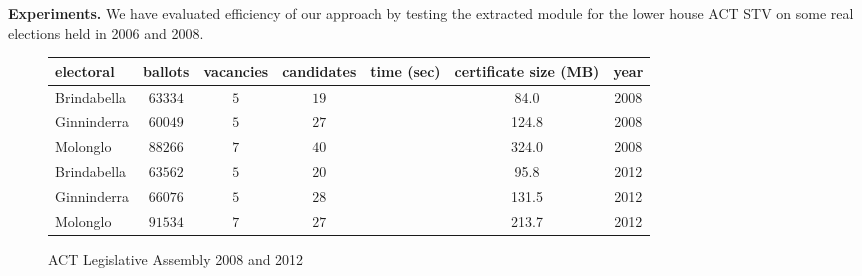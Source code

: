 \documentclass{llncs}
\begin{document}
 \noindent\textbf{Experiments.} We have evaluated efficiency of our approach by testing the extracted module for the lower house ACT STV on some real elections held in 2006 and 2008. 
 \begin{small}
\begin{figure}[b]
\centering
\begin{tabular}{|l |c |c |c |c |c|c|}
\hline
electoral & ballots& vacancies& candidates& time (sec)& certificate size (MB)&year\\
\hline
Brindabella &$63334$&$5$&$19$&&84.0&2008\\
Ginninderra &$60049$&$5$&$27$&&124.8&2008\\
Molonglo &$88266$&$7$&$40$&&324.0&2008\\
Brindabella&$63562$&$5$&$20$&&95.8&2012\\
Ginninderra&$66076$&$5$&$28$&&131.5&2012\\
Molonglo&$91534$&$7$&$27$&&213.7&2012\\
\hline
\end{tabular}
\caption{ACT Legislative Assembly 2008 and 2012}
\label{ref;figure6}
\end{figure}
\end{small}  
\end{document}
